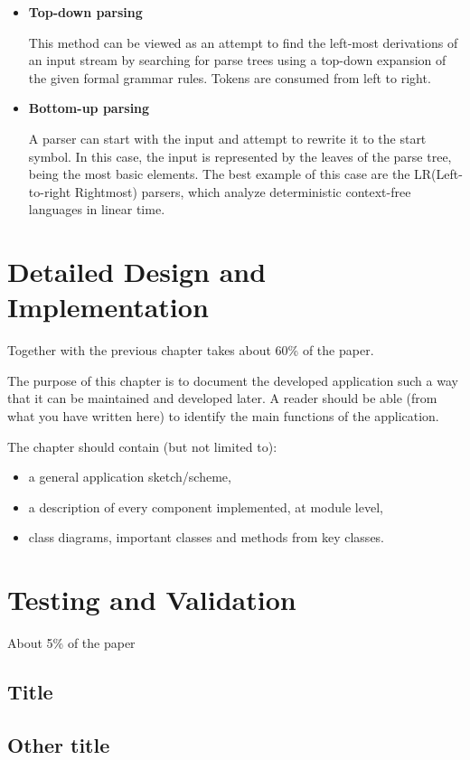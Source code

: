 \documentclass[12pt,a4paper,twoside]{report}
\begin{document}
 	\begin{itemize}
 		\item \textbf{Top-down parsing}
 		
 		This method can be viewed as an attempt to find the left-most derivations of an input stream by searching for parse trees using a top-down expansion of the given formal grammar rules. Tokens are consumed from left to right.
 		
 		\item \textbf{Bottom-up parsing}
 		
 		A parser can start with the input and attempt to rewrite it to the start symbol. In this case, the input is represented by the leaves of the parse tree, being the most basic elements. The best example of this case are the LR(Left-to-right Rightmost) parsers, which analyze deterministic context-free languages in linear time.
 	\end{itemize}

\chapter{Detailed Design and Implementation}

Together with the previous chapter takes about 60\% of the paper.

The purpose of this chapter is to document the developed application such a way that it can be maintained and developed later. A reader should be able (from what you have written here) to identify the main functions of the application.

The chapter should contain (but not limited to):
\begin{itemize}
 \item a general application sketch/scheme,
\item a description of every component implemented, at module level,
\item class diagrams, important classes and methods from key classes.
\end{itemize}

\chapter{Testing and Validation}

About 5\% of the paper
\section{Title}
\section{Other title}
\end{document}
